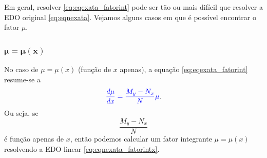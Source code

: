 Em geral, resolver \eqref{eq:eqexata_fatorint} pode ser tão ou mais difícil que resolver a EDO original \eqref{eq:eqnexata}. Vejamos alguns casos em que é possível encontrar o fator $\mu$.

\subsubsection{$\pmb{\mu = \mu(x)}$}

No caso de $\mu = \mu(x)$ (função de $x$ apenas), a equação \eqref{eq:eqexata_fatorint} resume-se a
\begin{equation}\label{eq:eqnexata_fatorintx}
  {\color{blue}\frac{d\mu}{dx} = \frac{M_y-N_x}{N}\mu}.
\end{equation}
Ou seja, se
\begin{equation}
  \frac{M_y-N_x}{N}
\end{equation}
é função apenas de $x$, então podemos calcular um fator integrante $\mu = \mu(x)$ resolvendo a EDO linear \eqref{eq:eqnexata_fatorintx}.

